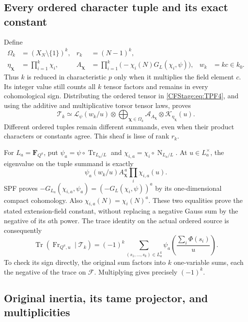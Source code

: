 \subsection{Every ordered character tuple and its exact constant}

Define
\[
 \begin{aligned}
 \Omega_k&=(X_N\setminus\{1\})^k,&
 r_k&=(N-1)^k,\\
 \eta_{\boldsymbol\chi}&=\prod_{i=1}^k\chi_i,&
 A_{\boldsymbol\chi}&=\prod_{i=1}^k
            \bigl(-\chi_i(N)G_L(\chi_i,\psi)\bigr),&
 w_k&=kc\in k_0 .
 \end{aligned}
 \tag{TPF.8}\label{CFStage:eq:TPF8}
\]
Thus \(k\) is reduced in characteristic \(p\) only when it
multiplies the field element \(c\). Its integer value still
counts all \(k\) tensor factors and remains in every
cohomological sign. Distributing the ordered tensor in
\eqref{CFStage:eq:TPF4}, and using the additive and multiplicative
torsor tensor laws, proves
\[
 \boxed{\displaystyle
 \mathcal T_k\simeq
 \mathcal L_\psi(w_k/u)\otimes
   \bigoplus_{\boldsymbol\chi\in\Omega_k}
        \mathcal A_{A_{\boldsymbol\chi}}
                  \otimes\mathcal K_{\eta_{\boldsymbol\chi}}(u).}
 \tag{TPF.9}\label{CFStage:eq:TPF9}
\]
Different ordered tuples remain different summands, even
when their product characters or constants agree.
This sheaf is lisse of rank \(r_k\).

For \(L_a=\mathbf F_{Q^a}\), put
\(\psi_a=\psi\circ\operatorname{Tr}_{L_a/L}\) and
\(\chi_{i,a}=\chi_i\circ\operatorname{N}_{L_a/L}\).
At \(u\in L_a^\times\), the eigenvalue on the tuple summand
is exactly
\[
 \psi_a(w_k/u) A_{\boldsymbol\chi}^{\,a}
              \prod_i\chi_{i,a}(u).
 \tag{TPF.10}\label{CFStage:eq:TPF10}
\]
SPF proves \(-G_{L_a}(\chi_{i,a},\psi_a)
=(-G_L(\chi_i,\psi))^a\) by its one-dimensional compact
cohomology. Also \(\chi_{i,a}(N)=\chi_i(N)^a\).
These two equalities prove the stated extension-field
constant, without replacing a negative Gauss sum by
the negative of its \(a\)th power. The trace identity on
the actual ordered source is consequently
\[
 \operatorname{Tr}(\operatorname{Fr}_{Q^a,u}\mid\mathcal T_k)
 =(-1)^k\sum_{(s_1,\ldots,s_k)\in L_a^k}
       \psi_a\left(\frac{\sum_i\Phi(s_i)}u\right).
 \tag{TPF.11}\label{CFStage:eq:TPF11}
\]
To check its sign directly, the original sum factors into
\(k\) one-variable sums, each the negative of the trace on
\(\mathcal F\). Multiplying gives precisely \((-1)^k\).

\subsection{Original inertia, its tame projector, and multiplicities}

